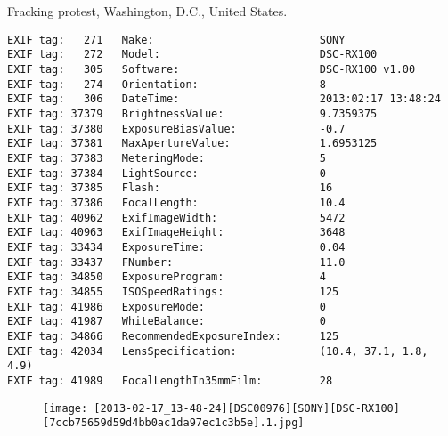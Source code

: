 \section{\protect{}}
\noindent Fracking protest, Washington, D.C., United States.
\noindent
\begin{lstlisting}
EXIF tag:   271   Make:                          SONY
EXIF tag:   272   Model:                         DSC-RX100
EXIF tag:   305   Software:                      DSC-RX100 v1.00
EXIF tag:   274   Orientation:                   8
EXIF tag:   306   DateTime:                      2013:02:17 13:48:24
EXIF tag: 37379   BrightnessValue:               9.7359375
EXIF tag: 37380   ExposureBiasValue:             -0.7
EXIF tag: 37381   MaxApertureValue:              1.6953125
EXIF tag: 37383   MeteringMode:                  5
EXIF tag: 37384   LightSource:                   0
EXIF tag: 37385   Flash:                         16
EXIF tag: 37386   FocalLength:                   10.4
EXIF tag: 40962   ExifImageWidth:                5472
EXIF tag: 40963   ExifImageHeight:               3648
EXIF tag: 33434   ExposureTime:                  0.04
EXIF tag: 33437   FNumber:                       11.0
EXIF tag: 34850   ExposureProgram:               4
EXIF tag: 34855   ISOSpeedRatings:               125
EXIF tag: 41986   ExposureMode:                  0
EXIF tag: 41987   WhiteBalance:                  0
EXIF tag: 34866   RecommendedExposureIndex:      125
EXIF tag: 42034   LensSpecification:             (10.4, 37.1, 1.8, 4.9)
EXIF tag: 41989   FocalLengthIn35mmFilm:         28

\end{lstlisting}
\clearpage
\begin{figure}
\raggedleft
\texttt{[image: [2013-02-17\_13-48-24][DSC00976][SONY][DSC-RX100][7ccb75659d59d4bb0ac1da97ec1c3b5e].1.jpg]}
\end{figure}


\clearpage
